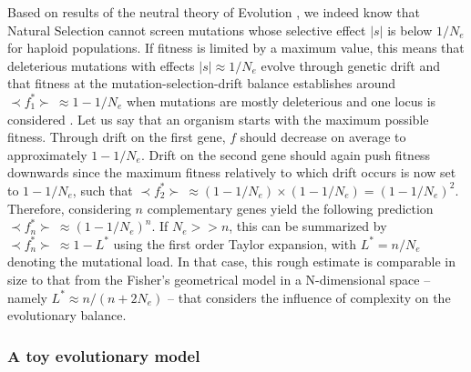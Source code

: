 Based on results of the neutral theory of Evolution \citep{Kimura62,Ohta73}, we indeed know that Natural Selection cannot screen mutations whose selective effect $|s|$ is below $1/N_e$ for haploid populations. If fitness is limited by a maximum value, this means that deleterious mutations with effects $|s|\approx 1/N_e$ evolve through genetic drift and that fitness at the mutation-selection-drift balance establishes around $\prec f_1^* \succ~\approx 1-1/N_e$ when mutations are mostly deleterious and one locus is considered \citep{Kimura58}. Let us say that an organism starts with the maximum possible fitness. Through drift on the first gene, $f$ should decrease on average to approximately $1-1/N_e$. Drift on the second gene should again push fitness downwards since the maximum fitness relatively to which drift occurs is now set to $1-1/N_e$, such that $\prec{f_2^*}\succ ~\approx (1-1/N_e)\times (1-1/N_e)=(1-1/N_e)^2$. Therefore, considering $n$ complementary genes yield the following prediction $\prec{f_n^*}\succ ~\approx (1-1/N_e)^n$. If $N_e>>n$, this can be summarized by $\prec{f_n^*}\succ ~\approx 1-L^*$ using the first order Taylor expansion, with $L^*=n/N_e$ denoting the mutational load. In that case, this rough estimate is comparable in size to that from the Fisher's geometrical model in a N-dimensional space -- namely $L^*\approx n/(n+2N_e)$ -- \citep{Hartl96,Poon00,Sella09} that considers the influence of complexity on the evolutionary balance.%

\subsubsection{A toy evolutionary model}

